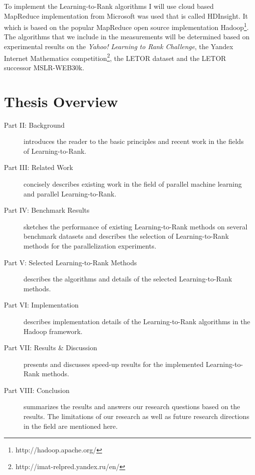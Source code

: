 To implement the Learning-to-Rank algorithms I will use cloud based MapReduce implementation from Microsoft was used that is called HDInsight. It which is based on the popular MapReduce open source implementation Hadoop\footnote{http://hadoop.apache.org/}.
The algorithms that we include in the measurements will be determined based on experimental results on the \emph{Yahoo! Learning to Rank Challenge}\cite{Chapelle2011a}, the Yandex Internet Mathematics competition\footnote{http://imat-relpred.yandex.ru/en/}, the LETOR\cite{Qin2010} dataset and the LETOR successor MSLR-WEB30k.

\chapter{Thesis Overview}

\begin{description}
\item[Part II: Background ]{introduces the reader to the basic principles and recent work in the fields of Learning-to-Rank.}
\item[Part III: Related Work]{concisely describes existing work in the field of parallel machine learning and parallel Learning-to-Rank.}
\item[Part IV: Benchmark Results]{sketches the performance of existing Learning-to-Rank methods on several benchmark datasets and describes the selection of Learning-to-Rank methods for the parallelization experiments.}
\item[Part V: Selected Learning-to-Rank Methods]{describes the algorithms and details of the selected Learning-to-Rank methods.}
\item[Part VI: Implementation]{describes implementation details of the Learning-to-Rank algorithms in the Hadoop framework.}
\item[Part VII: Results \& Discussion]{presents and discusses speed-up results for the implemented Learning-to-Rank methods.}
\item[Part VIII: Conclusion]{summarizes the results and answers our research questions based on the results. The limitations of our research as well as future research directions in the field are mentioned here.}
\end{description}